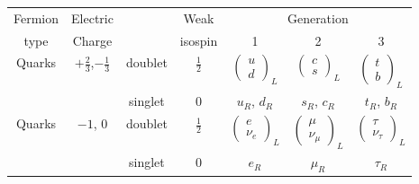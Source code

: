 \begin{tabular}{|c|c|c c|c c c|}
  \hline
  Fermion & Electric& & Weak & \multicolumn{3}{c|}{Generation}\\
  type & Charge & & isospin & 1 & 2 & 3 \\
  \hline
  \multirow{2}{*}{Quarks} & \multirow{2}{*}{$+\frac{2}{3}$,$-\frac{1}{3}$} & doublet & $\frac{1}{2}$ & $\begin{pmatrix}u\\d\end{pmatrix}_L$ & $\begin{pmatrix}c\\s\end{pmatrix}_L$ & $\begin{pmatrix}t\\b\end{pmatrix}_L$ \\
          & & singlet & 0 & $u_R$, $d_R$ & $s_R$, $c_R$ & $t_R$, $b_R$ \\
  \hline
  \multirow{2}{*}{Quarks} & \multirow{2}{*}{$-1$, $0$} & doublet & $\frac{1}{2}$ & $\begin{pmatrix}e\\ \nu_e\end{pmatrix}_L$ & $\begin{pmatrix}\mu\\ \nu_\mu\end{pmatrix}_L$ & $\begin{pmatrix}\tau\\ \nu_\tau\end{pmatrix}_L$ \\
          & & singlet & 0 & $e_R$ & $\mu_R$ & $\tau_R$ \\
  \hline
\end{tabular}